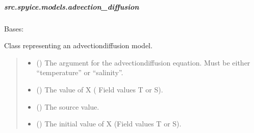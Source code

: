 \documentclass[a4paper,11pt,english,openany]{sphinxmanual}
\begin{document}
\subparagraph{src.spyice.models.advection\_diffusion}
\label{\detokenize{api/spyice.models.advection_diffusion:module-src.spyice.models.advection_diffusion}}\label{\detokenize{api/spyice.models.advection_diffusion:src-spyice-models-advection-diffusion}}\label{\detokenize{api/spyice.models.advection_diffusion::doc}}

\begin{fulllineitems}
\label{\detokenize{api/spyice.models.advection_diffusion:src.spyice.models.advection_diffusion.AdvectionDiffusion}}
\pysigstartsignatures
\pysigline
{}
\pysigstopsignatures
\sphinxAtStartPar
Bases: 

\sphinxAtStartPar
Class representing an advection\sphinxhyphen{}diffusion model.
\begin{quote}\begin{description}
\begin{itemize}
\item {} 
\sphinxAtStartPar
{} () \textendash{} The argument for the advection\sphinxhyphen{}diffusion equation. Must be either “temperature” or “salinity”.

\item {} 
\sphinxAtStartPar
{} () \textendash{} The value of X ( Field values T or S).

\item {} 
\sphinxAtStartPar
{} () \textendash{} The source value.

\item {} 
\sphinxAtStartPar
{} () \textendash{} The initial value of X (Field values T or S).


\end{itemize}
\end{description}
\end{quote}
\end{fulllineitems}
\end{document}

